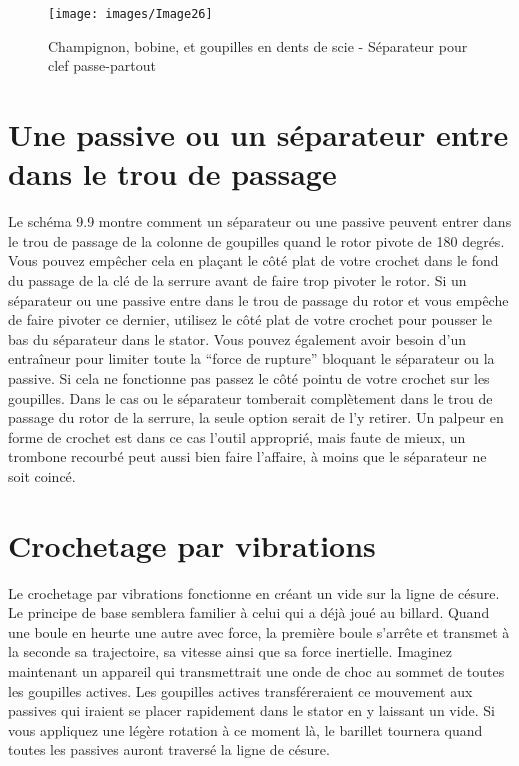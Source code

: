 \documentclass[a4paper,french,11pt,twoside]{report}
\begin{document}

\begin{figure}[ht] \begin{center}
        \texttt{[image: images/Image26]}
        \caption{Champignon, bobine, et goupilles en dents de scie - Séparateur pour clef passe-partout}
\end{center} \end{figure}


\section{\label{passive_separateur_trou_passage}Une passive ou un séparateur entre dans le trou de passage}

Le schéma 9.9 montre comment un séparateur ou une passive peuvent entrer dans le trou de passage de la colonne de goupilles quand le rotor pivote de 180 degrés. Vous pouvez empêcher cela en plaçant le côté plat de votre crochet dans le fond du passage de la clé de la serrure avant de faire trop pivoter le rotor. Si un séparateur ou une passive entre dans le trou de passage du rotor et vous empêche de faire pivoter ce dernier, utilisez le côté plat de votre crochet pour pousser le bas du séparateur dans le stator. Vous pouvez également avoir besoin d'un entraîneur pour limiter toute la \enquote{force de rupture} bloquant le séparateur ou la passive. Si cela ne fonctionne pas passez le côté pointu de votre crochet sur les goupilles. Dans le cas ou le séparateur tomberait complètement dans le trou de passage du rotor de la serrure, la seule option serait de l'y retirer. Un palpeur en forme de crochet est dans ce cas l'outil approprié, mais faute de mieux, un trombone recourbé peut aussi bien faire l'affaire, à moins que le séparateur ne soit coincé.

\section{Crochetage par vibrations}
Le crochetage par vibrations fonctionne en créant un vide sur la ligne de césure. Le principe de base semblera familier à celui qui a déjà joué au billard. Quand une boule en heurte une autre avec force, la première boule s'arrête et transmet à la seconde sa trajectoire, sa vitesse ainsi que sa force inertielle. Imaginez maintenant un appareil qui transmettrait une onde de choc au sommet de toutes les goupilles actives. Les goupilles actives transféreraient ce mouvement aux passives qui iraient se placer rapidement dans le stator en y laissant un vide. Si vous appliquez une légère rotation à ce moment là, le barillet tournera quand toutes les passives auront traversé la ligne de césure.
\end{document}
